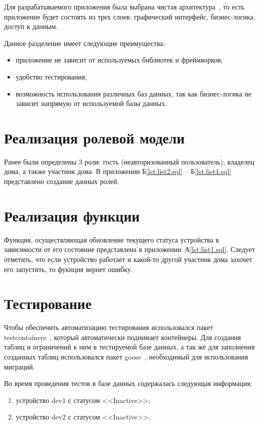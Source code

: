 Для разрабатываемого приложения была выбрана чистая архитектура~\cite{cleanArch}, то есть приложение будет 
состоять из трех слоев: графический интерфейс, бизнес-логика, доступ к данным.

Данное разделение имеет следующие преимущества:
\begin{itemize}
    \item приложение не зависит от используемых библиотек и фреймворков;
    \item удобство тестирования;
    \item возможность использования различных баз данных, так как
    бизнес-логика не зависит напрямую от используемой базы данных.
\end{itemize}

\section{Реализация ролевой модели}
Ранее были определены 3 роли: гость (неавторизованный пользователь), 
владелец дома, а также участник дома. 
В приложении Б\ref{lst:list2.sql} -- Б\ref{lst:list4.sql} представлено создание данных ролей.

\section{Реализация функции}

Функция, осуществляющая обновление текущего статуса 
устройства в зависимости от его состояние представлена 
в приложении~А\ref{lst:list1.sql}. Следует отметить, что если 
устройство работает и какой-то другой участник дома 
захочет его запустить, то фукнция вернет ошибку.  

\section{Тестирование}

Чтобы обеспечить автоматизацию тестирования
использовался пакет testcontainers~\cite{testcontainers}, который
автоматически поднимает контейнеры. Для создания таблиц 
и ограничений к ним в тестируемой базе данных, а так же
для заполнения созданных таблиц использовался пакет goose~\cite{goose}, 
необходимый для использования миграций.

Во время проведения тестов в базе данных содержалась 
следующая информация:

\begin{enumerate}
    \item устройство dev1 с статусом <<Inactive>>;
    \item устройство dev2 с статусом <<Inactive>>.
\end{enumerate}

